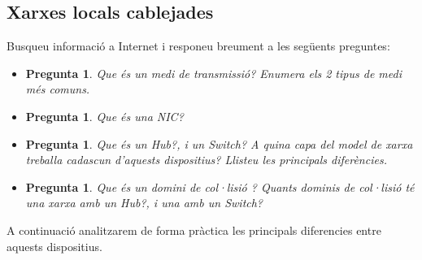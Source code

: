 \documentclass[12pt,a4paper]{article}
\newcounter{exercises}
\newtheorem{exer}[exercises]{Pregunta}
\begin{document}
\subsection{Xarxes locals cablejades}

Busqueu informació a Internet i responeu breument a les següents preguntes:

\begin{itemize}
\item \begin{exer}Que és un medi de transmissió? Enumera els 2 tipus de medi més comuns.\end{exer}
\item  \begin{exer} Que és una NIC?\end{exer}
\item \begin{exer}Que és un Hub?, i un Switch? A quina capa del model de xarxa treballa cadascun d'aquests dispositius? Llisteu les principals diferències.\end{exer}
\item \begin{exer}Que és un domini de col·lisió ? Quants dominis de col·lisió té una xarxa amb un Hub?, i una amb un Switch?\end{exer}
\end{itemize}

A continuació analitzarem de forma pràctica les principals diferencies entre aquests dispositius.
\end{document}
